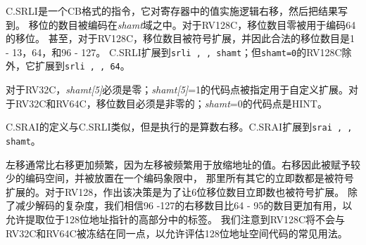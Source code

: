 C.SRLI是一个CB格式的指令，它对寄存器{\em \rdprime}中的值实施逻辑右移，然后把结果写到{\em \rdprime}。
移位的数目被编码在{\em shamt}域之中。对于RV128C，移位数目零被用于编码64的移位。
甚至，对于RV128C，移位数目被符号扩展，并因此合法的移位数目是1 - 13，64，和96 - 127。
C.SRLI扩展到{\tt srli \rdprime, \rdprime, shamt}；但{\tt shamt=0}的RV128C除外，它扩展到{\tt srli \rdprime, \rdprime, 64}。

对于RV32C，{\em shamt[5]}必须是零；{\em shamt[5]}=1的代码点被指定用于自定义扩展。对于RV32C和RV64C，移位数目必须是非零的；{\em shamt}=0的代码点是HINT。

C.SRAI的定义与C.SRLI类似，但是执行的是算数右移。C.SRAI扩展到{\tt srai \rdprime, \rdprime, shamt}。

\begin{commentary}
左移通常比右移更加频繁，因为左移被频繁用于放缩地址的值。右移因此被赋予较少的编码空间，并被放置在一个编码象限中，
那里所有其它的立即数都是被符号扩展的。对于RV128，作出该决策是为了让6位移位数目立即数也被符号扩展。
除了减少解码的复杂度，我们相信96 -127的右移数目比64 - 95的数目更加有用，以允许提取位于128位地址指针的高部分中的标签。
我们注意到RV128C将不会与RV32C和RV64C被冻结在同一点，以允许评估128位地址空间代码的常见用法。
\end{commentary}

